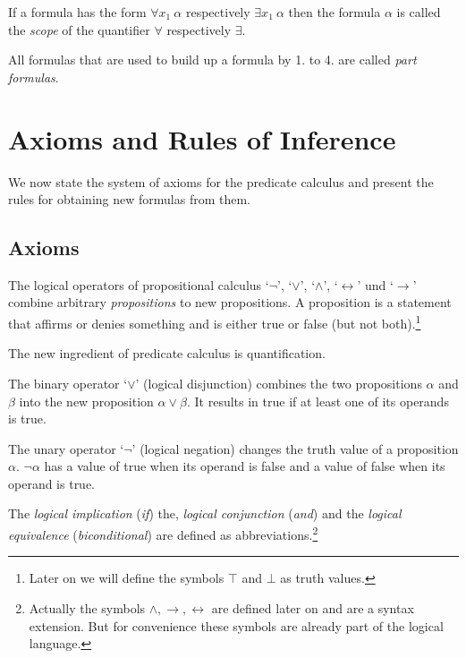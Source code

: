 \documentclass[a4paper,german,10pt,twoside]{book}
\theoremstyle{definition}
\theoremstyle{remark}
\begin{document}
\par
If a formula has the form $\forall x_1 ~ \alpha$ respectively $\exists x_1 ~ \alpha$ then the formula $\alpha$ is called the
\emph{scope} of the quantifier $\forall$ respectively $\exists$.

\par
All formulas that are used to build up a formula by 1. to 4. are called \emph{part formulas}.



\chapter{Axioms and Rules of Inference} \label{chapter4} \hypertarget{chapter4}{}

We now state the system of axioms for the predicate calculus and present the rules for obtaining new formulas from them.

\section{Axioms} \label{chapter4_section0} \hypertarget{chapter4_section0}{}
The logical operators of propositional calculus \mbox{`$\neg$'}, \mbox{`$\vee$'}, \mbox{`$\wedge$'}, \mbox{`$\leftrightarrow$'} und \mbox{`$\rightarrow$'} combine arbitrary \emph{propositions} to new propositions.
A proposition is a statement that affirms or denies something and is either {\glqq true\grqq} or {\glqq false\grqq} (but not both).\footnote{Later on we will define the symbols $\top$ and $\bot$ as truth values.}

The new ingredient of predicate calculus is quantification.

The binary operator \mbox{`$\vee$'} (logical disjunction) combines the two propositions $\alpha$ and $\beta$ into the new proposition $\alpha \vee \beta$. It results in true if at least one of its operands is true.

\par
The unary operator \mbox{`$\neg$'} (logical negation) changes the truth value of a proposition $\alpha$. $\neg \alpha$ has a value of true when its operand is false and a value of false when its operand is true. 

\par
The \emph{logical implication} (\emph{if}) the, \emph{logical conjunction} (\emph{and}) and the \emph{logical equivalence} (\emph{biconditional}) are defined as abbreviations.\footnote{Actually the symbols $\wedge, \rightarrow, 
\leftrightarrow$ are defined later on and are a syntax extension. But for convenience these symbols are already part of the logical language.}
\end{document}
